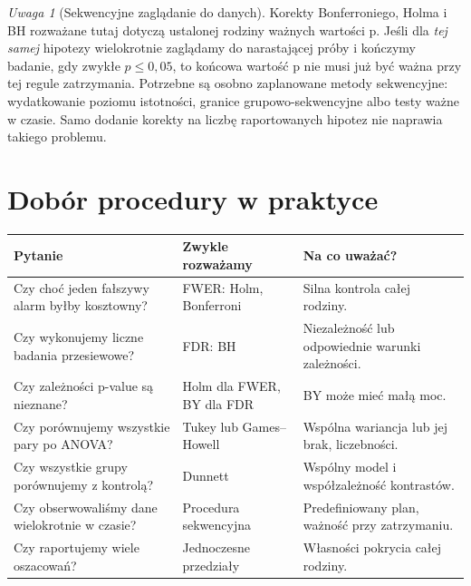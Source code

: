 \documentclass[11pt,a4paper,oneside]{report}
\numberwithin{equation}{chapter}
\theoremstyle{plain}
\theoremstyle{definition}
\theoremstyle{remark}
\newtheorem{uwaga}{Uwaga}[chapter]
\begin{document}
\begin{uwaga}[Sekwencyjne zaglądanie do danych]
Korekty Bonferroniego, Holma i BH rozważane tutaj
dotyczą ustalonej rodziny ważnych wartości p.
Jeśli dla \emph{tej samej} hipotezy wielokrotnie zaglądamy
do narastającej próby i kończymy badanie, gdy zwykłe
$p\le0{,}05$, to końcowa wartość p nie musi już być
ważna przy tej regule zatrzymania. Potrzebne są osobno
zaplanowane metody sekwencyjne: wydatkowanie poziomu
istotności, granice grupowo-sekwencyjne albo testy ważne
w czasie. Samo dodanie korekty na liczbę raportowanych
hipotez nie naprawia takiego problemu.
\end{uwaga}

\section{Dobór procedury w praktyce}
\begin{center}\small
\begin{tabular}{>{\raggedright\arraybackslash}p{}>{\raggedright\arraybackslash}p{}>{\raggedright\arraybackslash}p{}}
\toprule
\textbf{Pytanie} & \textbf{Zwykle rozważamy} & \textbf{Na co uważać?}\\
\midrule
Czy choć jeden fałszywy alarm byłby kosztowny? & FWER: Holm, Bonferroni & Silna kontrola całej rodziny.\\
Czy wykonujemy liczne badania przesiewowe? & FDR: BH & Niezależność lub odpowiednie warunki zależności.\\
Czy zależności p-value są nieznane? & Holm dla FWER, BY dla FDR & BY może mieć małą moc.\\
Czy porównujemy wszystkie pary po ANOVA? & Tukey lub Games--Howell & Wspólna wariancja lub jej brak, liczebności.\\
Czy wszystkie grupy porównujemy z kontrolą? & Dunnett & Wspólny model i współzależność kontrastów.\\
Czy obserwowaliśmy dane wielokrotnie w czasie? & Procedura sekwencyjna & Predefiniowany plan, ważność przy zatrzymaniu.\\
Czy raportujemy wiele oszacowań? & Jednoczesne przedziały & Własności pokrycia całej rodziny.\\
\bottomrule
\end{tabular}
\end{center}
\end{document}

